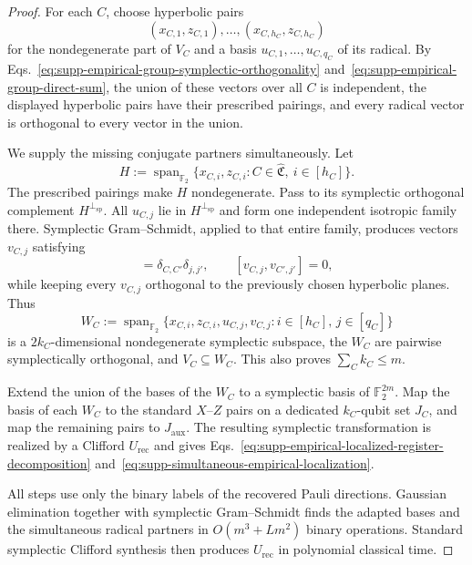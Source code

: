 \documentclass[
  aps,
  prx,
  reprint,
  superscriptaddress,
  amsmath,
  amssymb,
  nofootinbib,
  longbibliography
]{revtex4-2}
\newcommand{\Span}{\operatorname{span}}
\newcommand{\Fc}{\mathbb{F}_2}
\begin{document}
\begin{proof}
For each $C$, choose hyperbolic pairs
\[
(x_{C,1},z_{C,1}),\dots,(x_{C,h_C},z_{C,h_C})
\]
for the nondegenerate part of $V_C$ and a basis
$u_{C,1},\dots,u_{C,q_C}$ of its radical.  By
Eqs.~\eqref{eq:supp-empirical-group-symplectic-orthogonality}
and~\eqref{eq:supp-empirical-group-direct-sum}, the union of these vectors
over all $C$ is independent, the displayed hyperbolic pairs have their
prescribed pairings, and every radical vector is orthogonal to every
vector in the union.

We supply the missing conjugate partners simultaneously.  Let
\begin{equation}
H
:=
\Span_{\Fc}
\{x_{C,i},z_{C,i}:C\in\widehat{\mathfrak C},\ i\in[h_C]\}.
\end{equation}
The prescribed pairings make $H$ nondegenerate.  Pass to its symplectic
orthogonal complement $H^{\perp_{\mathrm{sp}}}$.  All $u_{C,j}$ lie in
$H^{\perp_{\mathrm{sp}}}$ and form one independent isotropic family
there.  Symplectic Gram--Schmidt, applied to that entire family, produces
vectors $v_{C,j}$ satisfying
\begin{equation}
[u_{C,j},v_{C',j'}]
=
\delta_{C,C'}\delta_{j,j'},
\qquad
[v_{C,j},v_{C',j'}]=0,
\end{equation}
while keeping every $v_{C,j}$ orthogonal to the previously chosen
hyperbolic planes.  Thus
\begin{equation}
W_C
:=
\Span_{\Fc}
\{x_{C,i},z_{C,i},u_{C,j},v_{C,j}:i\in[h_C],\,j\in[q_C]\}
\end{equation}
is a $2k_C$-dimensional nondegenerate symplectic subspace, the $W_C$ are
pairwise symplectically orthogonal, and $V_C\subseteq W_C$.  This also
proves $\sum_Ck_C\le m$.

Extend the union of the bases of the $W_C$ to a symplectic basis of
$\Fc^{2m}$.  Map the basis of each $W_C$ to the standard $X$--$Z$ pairs
on a dedicated $k_C$-qubit set $J_C$, and map the remaining pairs to
$J_{\mathrm{aux}}$.  The resulting symplectic transformation is realized
by a Clifford $U_{\mathrm{rec}}$ and gives
Eqs.~\eqref{eq:supp-empirical-localized-register-decomposition}
and~\eqref{eq:supp-simultaneous-empirical-localization}.

All steps use only the binary labels of the recovered Pauli directions.  Gaussian
elimination together with symplectic Gram--Schmidt finds the adapted bases
and the simultaneous radical partners in $O(m^3+Lm^2)$ binary operations.
Standard symplectic Clifford synthesis then produces $U_{\mathrm{rec}}$
in polynomial classical time.
\end{proof}
\end{document}
